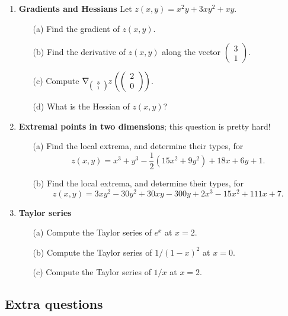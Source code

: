 \documentclass[11pt,a4paper]{scrartcl}
\begin{document}
\begin{enumerate}

\item \textbf{Gradients and Hessians} Let $z(x,y) = x^2y + 3xy^2 + xy$.
	\begin{itemize}
		\item[(a)] Find the gradient of $z(x,y)$.
		\item[(b)] Find the derivative of $z(x,y)$ along the vector $\left(\begin{array}{c} 3 \\ 1 \end{array}\right).$
		\item[(c)] Compute $\nabla_{\tiny\left(\begin{array}{c} 3 \\ 1 \end{array}\right)} z \left(\left(\begin{array}{c} 2 \\ 0 \end{array}\right)\right)$.
                  \item[(d)] What is the Hessian of $z(x,y)$?
\end{itemize}

	
	\item \textbf{Extremal points in two dimensions}; this question is pretty hard!
	\begin{itemize}
		\item[(a)] Find the local extrema, and determine their types, for
		\[z(x,y) = x^3 + y^3 - \frac{1}{2}(15x^2 + 9y^2) + 18x + 6y + 1.\]
		\item[(b)] Find the local extrema, and determine their types, for
		\[z(x,y) = 3xy^2 - 30y^2 + 30xy - 300y + 2x^3 - 15x^2 + 111x + 7.\]
	\end{itemize}
	
	\item \textbf{Taylor series}
	\begin{itemize}
		\item[(a)] Compute the Taylor series of $e^x$ at $x=2$.
		\item[(b)] Compute the Taylor series of $1/(1-x)^2$ at $x=0$.
		\item[(c)] Compute the Taylor series of $1/x$ at $x=2$. 
	\end{itemize}
	
        
\end{enumerate}

\subsection*{Extra questions}
\end{document}
